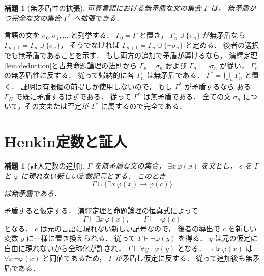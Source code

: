 \documentclass[a5paper,10pt,onecolumn]{jsarticle}
\makeatletter
\theoremstyle{mathnotetheorem}
\newtheorem{lemma}[theorem]{補題}
\renewcommand{\proofname}{証明}
\renewenvironment{proof}[1][\proofname]{%
  \par\pushQED{\qed}\normalfont\topsep4\p@\@plus2\p@\relax
  \trivlist\item[\hskip\labelsep\bfseries #1]\ignorespaces
}{\popQED\endtrivlist\@endpefalse}
\makeatother
\begin{document}
\begin{lemma}[無矛盾性の拡張]\label{lem:maximal}
可算言語における無矛盾な文の集合 $\Gamma$ は，
無矛盾かつ完全な文の集合 $\Gamma^*$ へ拡張できる．
\end{lemma}
\begin{proof}
言語の文を $\sigma_0,\sigma_1,\dots$ と列挙する．
$\Gamma_0=\Gamma$ と置き，
$\Gamma_n\cup\{\sigma_n\}$ が無矛盾なら
$\Gamma_{n+1}=\Gamma_n\cup\{\sigma_n\}$，
そうでなければ
$\Gamma_{n+1}=\Gamma_n\cup\{\neg\sigma_n\}$
と定める．
後者の選択でも無矛盾であることを示す．
もし両方の追加で矛盾が導けるなら，
演繹定理\ref{lem:deduction}と古典命題論理の法則から
$\Gamma_n\vdash\sigma_n$ および
$\Gamma_n\vdash\neg\sigma_n$ が従い，
$\Gamma_n$ の無矛盾性に反する．
従って帰納的に各 $\Gamma_n$ は無矛盾である．
$\Gamma^*=\bigcup_n\Gamma_n$ と置く．
証明は有限個の前提しか使用しないので，
もし $\Gamma^*$ が矛盾するなら
ある $\Gamma_N$ で既に矛盾するはずである．
従って $\Gamma^*$ は無矛盾である．
全ての文 $\sigma_n$ について，その文または否定が
$\Gamma^*$ に属するので完全である．
\end{proof}

\section{Henkin定数と証人}

\begin{lemma}[証人定数の追加]\label{lem:henkin-step}
$\Gamma$ を無矛盾な文の集合，
$\exists x\,\varphi(x)$ を文とし，
$c$ を $\Gamma$ と $\varphi$ に現れない新しい定数記号とする．
このとき
\[
 \Gamma\cup\{\exists x\,\varphi(x)\to\varphi(c)\}
\]
は無矛盾である．
\end{lemma}
\begin{proof}
矛盾すると仮定する．
演繹定理と命題論理の恒真式によって
\[
 \Gamma\vdash\exists x\,\varphi(x),
 \qquad
 \Gamma\vdash\neg\varphi(c)
\]
となる．
$c$ は元の言語に現れない新しい記号なので，
後者の導出で $c$ を新しい変数 $y$ に一様に置き換えられる．
従って $\Gamma\vdash\neg\varphi(y)$ を得る．
$y$ は元の仮定に自由に現れないから全称化が許され，
$\Gamma\vdash\forall y\,\neg\varphi(y)$ となる．
$\neg\exists x\,\varphi(x)$ は
$\forall x\,\neg\varphi(x)$ と同値であるため，
$\Gamma$ が矛盾し仮定に反する．
従って追加後も無矛盾である．
\end{proof}
\end{document}
